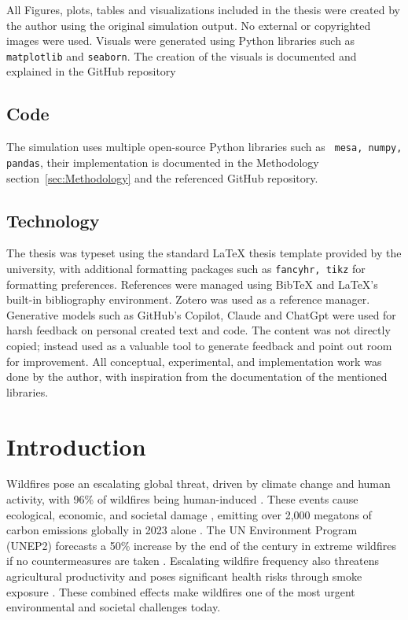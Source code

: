 \documentclass[11pt, a4paper]{article}
\begin{document}
All Figures, plots, tables and visualizations included in the thesis were created by the author using the original simulation output. No external or copyrighted images were used. Visuals were generated using Python libraries such as \texttt{matplotlib} and \texttt{seaborn}. The creation of the visuals is documented and explained in the GitHub repository \citep{AgentBasedFirefightingModel_repository}

\subsection{Code}

The simulation uses multiple open-source Python libraries such as \texttt{ mesa, numpy, pandas}, their implementation is documented in the Methodology section~\ref{sec:Methodology} and the referenced GitHub repository.

\subsection{Technology}

The thesis was typeset using the standard LaTeX thesis template provided by the university, with additional formatting packages such as \texttt{fancyhr, tikz} for formatting preferences. References were managed using BibTeX and LaTeX’s built-in bibliography environment. Zotero was used as a reference manager.
Generative models such as GitHub's Copilot, Claude and ChatGpt were used for harsh feedback on personal created text and code. The content was not directly copied; instead used as a valuable tool to generate feedback and point out room for improvement. All conceptual, experimental, and implementation work was done by the author, with inspiration from the documentation of the mentioned libraries.

\section{Introduction}
\label{sec:Introduction}


Wildfires pose an escalating global threat, driven by climate change and human activity, with 96\% of wildfires being human-induced \citep{HybridAntColonyWildfire}. These events cause ecological, economic, and societal damage \citep{Saffre2022}, emitting over 2,000 megatons of carbon emissions globally in 2023 alone \citep{Lelis2024}. The UN Environment Program (UNEP2) forecasts a 50\% increase by the end of the century in extreme wildfires if no countermeasures are taken \citep{Sullivan2022}. Escalating wildfire frequency also threatens agricultural productivity \citep{IPCC2023} and poses significant health risks through smoke exposure \citep{Finlay2012}. These combined effects make wildfires one of the most urgent environmental and societal challenges today.
\end{document}
